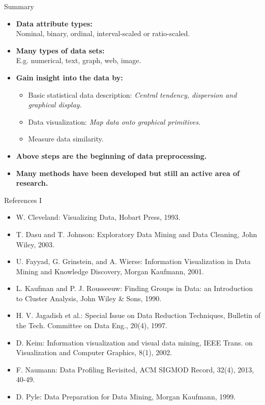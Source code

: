 \documentclass[aspectratio=169,t]{beamer}
\begin{document}
  { 
    \begin{frame}{Summary}
    \centering
    \begin{itemize}
        \item \textbf{Data attribute types:}\\
              Nominal, binary, ordinal, interval-scaled or ratio-scaled.
        \item \textbf{Many types of data sets:}\\
              E.g. numerical, text, graph, web, image.
        \item \textbf{Gain insight into the data by:}
        \begin{itemize}
          \item Basic statistical data description: \emph{Central tendency, dispersion and graphical display.}
          \item Data visualization: \emph{Map data onto graphical primitives.}
          \item Measure data similarity.
        \end{itemize}
        \item \textbf{Above steps are the beginning of data preprocessing.}
        \item \textbf{Many methods have been developed but still an active area of research.}
    \end{itemize}
    \end{frame}
  }

  { 
    \begin{frame}{References I}
        \begin{itemize}
          \item W. Cleveland: Visualizing Data, Hobart Press, 1993.
          \item T. Dasu and T. Johnson: Exploratory Data Mining and Data Cleaning, John Wiley, 2003.
          \item U. Fayyad, G. Grinstein, and A. Wierse: Information Visualization in Data Mining and Knowledge Discovery, Morgan Kaufmann, 2001.
          \item L. Kaufman and P. J. Rousseeuw: Finding Groups in Data: an Introduction to Cluster Analysis, John Wiley \& Sons, 1990.
          \item H. V. Jagadish et al.: Special Issue on Data Reduction Techniques, Bulletin of the Tech. Committee on Data Eng., 20(4), 1997.
          \item D. Keim: Information visualization and visual data mining, IEEE Trans. on Visualization and Computer Graphics, 8(1), 2002.
          \item F. Naumann: Data Profiling Revisited, ACM SIGMOD Record, 32(4), 2013, 40-49.
          \item D. Pyle: Data Preparation for Data Mining, Morgan Kaufmann, 1999.
        \end{itemize}
    \end{frame}
  }
\end{document}
